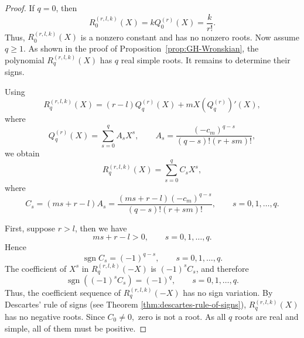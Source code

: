 \documentclass[preprint,3p,10pt]{elsarticle}
\theoremstyle{definition}
\begin{document}
\begin{proof}
If \(q=0\), then
\begin{equation}
    R_0^{(r,l,k)}(X)
    =
    kQ_0^{(r)}(X)
    =
    \frac{k}{r!}.
\end{equation}
Thus, \(R_0^{(r,l,k)}(X)\) is a nonzero constant and has no nonzero roots.
Now assume \(q\geq1\). As shown in the proof of
Proposition~\ref{prop:GH-Wronskian}, the polynomial
\(R_q^{(r,l,k)}(X)\) has \(q\) real simple roots. It remains to determine their signs.

Using
\begin{equation}
    R_q^{(r,l,k)}(X)
    =
    (r-l)Q_q^{(r)}(X)
    +
    mX\left(Q_q^{(r)}\right)'(X),
\end{equation}
where
\begin{equation}
    Q_q^{(r)}(X)=\sum_{s=0}^{q}A_sX^s,
    \qquad
    A_s=
    \frac{(-c_m)^{q-s}}{(q-s)!(r+sm)!},
\end{equation}
we obtain
\begin{equation}
    R_q^{(r,l,k)}(X)
    =
    \sum_{s=0}^{q}C_sX^s,
\end{equation}
where
\begin{equation}
    C_s
    =
    (ms+r-l)A_s
    =
    \frac{(ms+r-l)(-c_m)^{q-s}}{(q-s)!(r+sm)!},
    \qquad s=0,1,\ldots,q.
\end{equation}

First, suppose \(r>l\), then we have
\begin{equation}
    ms+r-l>0,
    \qquad s=0,1,\ldots,q.
\end{equation}
Hence
\begin{equation}
    \operatorname{sgn}C_s=(-1)^{q-s},
    \qquad s=0,1,\ldots,q.
\end{equation}
The coefficient of \(X^s\) in \(R_q^{(r,l,k)}(-X)\) is \((-1)^sC_s\), and
therefore
\begin{equation}
    \operatorname{sgn}\left((-1)^sC_s\right)=(-1)^q,
    \qquad s=0,1,\ldots,q.
\end{equation}
Thus, the coefficient sequence of \(R_q^{(r,l,k)}(-X)\) has no sign variation.
By Descartes' rule of signs (see Theorem \ref{thm:descartes-rule-of-signs}), \(R_q^{(r,l,k)}(X)\) has no negative roots. Since $C_0 
    \neq0,$ zero is not a root. As all \(q\) roots are real and simple, all of them must be positive.


\end{proof}
\end{document}
